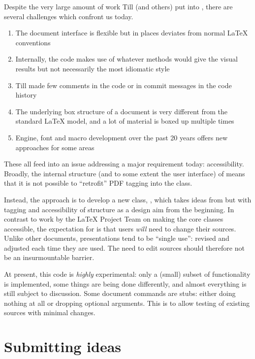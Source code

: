 \documentclass{l3doc}
\begin{document}
\begin{documentation}
Despite the very large amount of work Till (and others) put into ,
there are several challenges which confront us today.
\begin{enumerate}
  \item The document interface is flexible but in places deviates from normal
    \LaTeX{} conventions
  \item Internally, the code makes use of whatever methods would give the
    visual results but not necessarily the most idiomatic style
  \item Till made few comments in the code or in commit messages in the code
    history
  \item The underlying box structure of a  document is very
    different from the standard \LaTeX{} model, and a lot of material is
    boxed up multiple times
  \item Engine, font and macro development over the past 20 years offers
    new approaches for some areas
\end{enumerate}
These all feed into an issue addressing a major requirement today:
accessibility. Broadly, the internal structure (and to some extent the user
interface) of  means that it is not possible to \enquote{retrofit}
PDF tagging into the class.

Instead, the approach is to develop a new class, , which takes
ideas from  but with tagging and accessibility of structure as a
design aim from the beginning. In contrast to work by the \LaTeX{} Project Team
on making the core classes accessible, the expectation for  is
that users \emph{will} need to change their sources. Unlike other documents,
presentations tend to be \enquote{single use}: revised and adjusted each time
they are used. The need to edit sources should therefore not be an
insurmountable barrier.

At present, this code is \emph{highly} experimental: only a (small) subset of
 functionality is implemented, some things are being done
differently, and almost everything is still subject to discussion. Some
document commands are stubs: either doing nothing at all or dropping optional
arguments. This is to allow testing of existing  sources with
minimal changes.

\section{Submitting ideas}


\end{documentation}
\end{document}

